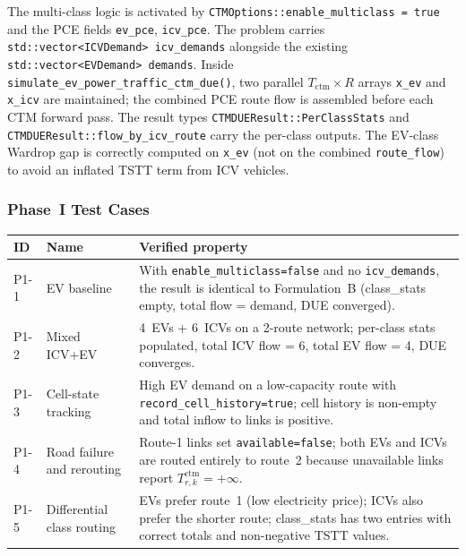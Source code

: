 The multi-class logic is activated by \texttt{CTMOptions::enable\_multiclass
= true} and the PCE fields \texttt{ev\_pce}, \texttt{icv\_pce}. The
problem carries \texttt{std::vector<ICVDemand> icv\_demands} alongside the
existing \texttt{std::vector<EVDemand> demands}. Inside
\texttt{simulate\_ev\_power\_traffic\_ctm\_due()}, two parallel
\(T_{\mathrm{ctm}}\times R\) arrays \texttt{x\_ev} and \texttt{x\_icv}
are maintained; the combined PCE route flow is assembled before each CTM
forward pass. The result types \texttt{CTMDUEResult::PerClassStats} and
\texttt{CTMDUEResult::flow\_by\_icv\_route} carry the per-class
outputs. The EV-class Wardrop gap is correctly computed on \texttt{x\_ev}
(not on the combined \texttt{route\_flow}) to avoid an inflated TSTT term
from ICV vehicles.

\subsubsection{Phase~I Test Cases}

\begin{center}
\small
\begin{tabularx}{\textwidth}{L{0.08\textwidth}L{0.20\textwidth}X}
\toprule
\textbf{ID} & \textbf{Name} & \textbf{Verified property} \\
\midrule
P1-1 & EV baseline &
  With \texttt{enable\_multiclass=false} and no \texttt{icv\_demands},
  the result is identical to Formulation~B (class\_stats empty,
  total flow = demand, DUE converged). \\
P1-2 & Mixed ICV+EV &
  4~EVs + 6~ICVs on a 2-route network; per-class stats populated,
  total ICV flow = 6, total EV flow = 4, DUE converges. \\
P1-3 & Cell-state tracking &
  High EV demand on a low-capacity route with
  \texttt{record\_cell\_history=true}; cell history is non-empty
  and total inflow to links is positive. \\
P1-4 & Road failure and rerouting &
  Route-1 links set \texttt{available=false}; both EVs and ICVs are
  routed entirely to route~2 because unavailable links report
  \(T^{\mathrm{ctm}}_{r,k}=+\infty\). \\
P1-5 & Differential class routing &
  EVs prefer route~1 (low electricity price); ICVs also prefer the
  shorter route; class\_stats has two entries with correct totals
  and non-negative TSTT values. \\
\bottomrule
\end{tabularx}
\end{center}

